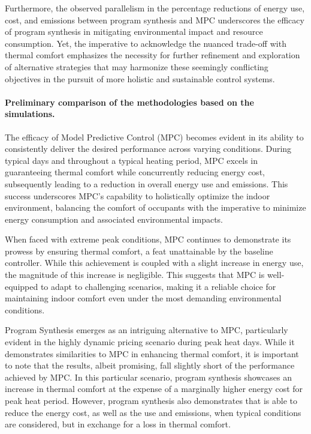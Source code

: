 Furthermore, the observed parallelism in the percentage reductions of energy use, cost, and emissions between program synthesis and MPC underscores the efficacy of program synthesis in mitigating environmental impact and resource consumption. Yet, the imperative to acknowledge the nuanced trade-off with thermal comfort emphasizes the necessity for further refinement and exploration of alternative strategies that may harmonize these seemingly conflicting objectives in the pursuit of more holistic and sustainable control systems.


\paragraph{Preliminary comparison of the methodologies based on the simulations.}

The efficacy of Model Predictive Control (MPC) becomes evident in its ability to consistently deliver the desired performance across varying conditions. During typical days and throughout a typical heating period, MPC excels in guaranteeing thermal comfort while concurrently reducing energy cost, subsequently leading to a reduction in overall energy use and emissions. This success underscores MPC's capability to holistically optimize the indoor environment, balancing the comfort of occupants with the imperative to minimize energy consumption and associated environmental impacts.

When faced with extreme peak conditions, MPC continues to demonstrate its prowess by ensuring thermal comfort, a feat unattainable by the baseline controller. While this achievement is coupled with a slight increase in energy use, the magnitude of this increase is negligible. This suggests that MPC is well-equipped to adapt to challenging scenarios, making it a reliable choice for maintaining indoor comfort even under the most demanding environmental conditions.

Program Synthesis emerges as an intriguing alternative to MPC, particularly evident in the highly dynamic pricing scenario during peak heat days. While it demonstrates similarities to MPC in enhancing thermal comfort, it is important to note that the results, albeit promising, fall slightly short of the performance achieved by MPC. In this particular scenario, program synthesis showcases an increase in thermal comfort at the expense of a marginally higher energy cost for peak heat period. However, program synthesis also demonstrates that is able to reduce the energy cost, as well as the use and emissions, when typical conditions are considered, but in exchange for a loss in thermal comfort. 


